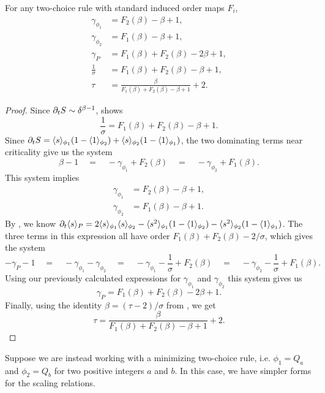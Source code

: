 \documentclass[twoside,10pt]{article}
\begin{document}
\begin{thrm}[]
	\label{2c-scaling-relations}
	For any two-choice rule with standard induced order maps $F_{i}$,
	\begin{align*}
		\gamma_{\phi_1} &= F_2(\beta) - \beta + 1,\\
		\gamma_{\phi_2} &= F_1(\beta) - \beta + 1,\\
		\gamma_{P} &= F_1(\beta)+F_2(\beta) - 2\beta + 1,\\
		\frac{1}{\sigma} &= F_1(\beta) + F_2(\beta) - \beta + 1,\\
		\tau &= \frac{\beta}{F_1(\beta)+F_2(\beta)-\beta+1} +2.
	\end{align*}
\end{thrm}
\begin{proof}
	Since $\partial_{t}{S} \sim \delta^{\beta-1}$,  shows
\[
	\frac{1}{\sigma} = F_1(\beta) + F_2(\beta) - \beta + 1.
\]
	Since $\partial_{t}{S} = \langle s \rangle_{\phi_1}(1-\langle 1 \rangle_{\phi_2}) + \langle s \rangle_{\phi_2}(1-\langle 1 \rangle_{\phi_1})$, the two dominating terms near criticality give us the system
\[
        \beta -1 \quad=\quad -\gamma_{\phi_1} + F_2(\beta) \quad=\quad -\gamma_{\phi_2} + F_1(\beta).
\]
This system implies
\begin{align*}
        \gamma_{\phi_1} &= F_2(\beta) - \beta + 1,\\
        \gamma_{\phi_2} &= F_1(\beta) - \beta + 1.
\end{align*}
By , we know $\partial_{t}{\langle s \rangle_{P}} = 2\langle s \rangle_{\phi_1}\langle s \rangle_{\phi_2} - \langle s^2 \rangle_{\phi_1}(1-\langle 1 \rangle_{\phi_2}) - \langle s^2 \rangle_{\phi_2}(1-\langle 1 \rangle_{\phi_1})$. The three terms in this expression all have order $F_1(\beta)+F_2(\beta) - 2/\sigma$, which gives the system
\[
        -\gamma_{P}-1 \quad=\quad -\gamma_{\phi_1}-\gamma_{\phi_2} \quad=\quad -\gamma_{\phi_1}-\frac{1}{\sigma} +F_2(\beta) \quad=\quad -\gamma_{\phi_2}-\frac{1}{\sigma} + F_1(\beta).
\]
Using our previously calculated expressions for $\gamma_{\phi_1}$ and $\gamma_{\phi_2}$ this system gives us
\[
        \gamma_{P} = F_1(\beta)+F_2(\beta) - 2\beta + 1.
\]
Finally, using the identity $\beta = (\tau-2)/\sigma$ from , we get
\[
        \tau = \frac{\beta}{F_1(\beta)+F_2(\beta)-\beta+1} +2.
\]
\end{proof}

Suppose we are instead working with a minimizing two-choice rule, i.e. $\phi_1=Q_{a}$ and $\phi_2=Q_{b}$ for two positive integers $a$ and $b$. In this case, we have simpler forms for the scaling relations.
\end{document}
